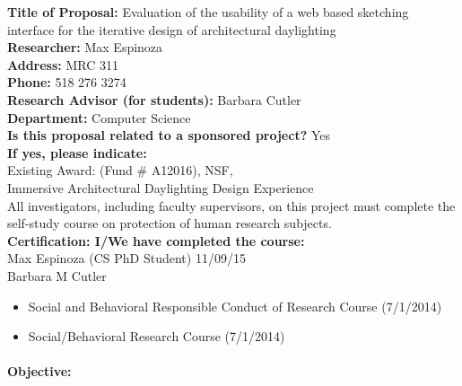 \documentclass[12pt]{article}
\begin{document}
\noindent
{\bf Title of Proposal:} Evaluation of the usability of a web based 
sketching interface for the iterative design of architectural daylighting \\
{\bf Researcher:}   Max Espinoza\\
{\bf Address:}  MRC 311\\
{\bf Phone:} 518 276 3274\\ 
{\bf Research Advisor (for students):}  Barbara Cutler \\
{\bf Department:}  Computer Science \\
{\bf Is this proposal related to a sponsored project?}  Yes \\
{\bf If yes,  please indicate:}  \\
Existing Award: (Fund \# A12016), NSF, \\
Immersive Architectural Daylighting Design Experience \\

\noindent
All investigators, including faculty supervisors, on this project must
complete the self-study course on protection of human research
subjects. \\
{\bf Certification:  I/We have completed the course:} \\
Max Espinoza (CS PhD Student) 11/09/15 \\ 
Barbara M Cutler
\begin{itemize}
          \item Social and Behavioral Responsible Conduct of Research Course (7/1/2014)
          \item Social/Behavioral Research Course (7/1/2014)
\end{itemize}

\paragraph{Objective:}
\end{document}
